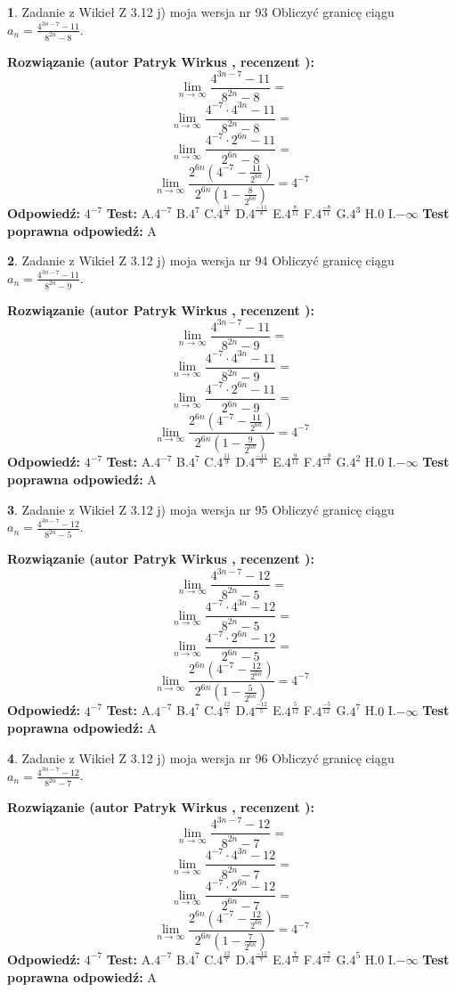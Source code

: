 \documentclass[12pt, a4paper]{article}
\theoremstyle{definition} %
\newtheorem{zad}{}
\newcommand{\zadStart}[1]{\begin{zad}#1\newline}
\newcommand{\zadStop}{\end{zad}}
\newcommand{\rozwStart}[2]{\noindent \textbf{Rozwiązanie (autor #1 , recenzent #2): }\newline}
\newcommand{\rozwStop}{\newline}
\newcommand{\odpStart}{\noindent \textbf{Odpowiedź:}\newline}
\newcommand{\odpStop}{\newline}
\newcommand{\testStart}{\noindent \textbf{Test:}\newline}
\newcommand{\testStop}{\newline}
\newcommand{\kluczStart}{\noindent \textbf{Test poprawna odpowiedź:}\newline}
\newcommand{\kluczStop}{\newline}
\begin{document}
\zadStart{Zadanie z Wikieł Z 3.12 j) moja wersja nr 93}
Obliczyć granicę ciągu $a_{n}=\frac{4^{3n-7}-11}{8^{2n}-8}$.
\zadStop
\rozwStart{Patryk Wirkus}{}
$$\lim\limits_{n\to\infty}\frac{4^{3n-7}-11}{8^{2n}-8}=$$
$$\lim\limits_{n\to\infty}\frac{4^{-7} \cdot 4^{3n}-11}{8^{2n}-8}=$$
$$\lim\limits_{n\to\infty}\frac{4^{-7} \cdot 2^{6n}-11}{2^{6n}-8}=$$
$$\lim\limits_{n\to\infty}\frac{2^{6n}(4^{-7} - \frac{11}{2^{6n}})}{2^{6n}(1-\frac{8}{2^{6n}})}= 4^{-7}$$
\rozwStop
\odpStart
$4^{-7}$
\odpStop
\testStart
A.$4^{-7}$
B.$4^{7}$
C.$4^{\frac{11}{8}}$
D.$4^{\frac{-11}{8}}$
E.$4^{\frac{8}{11}}$
F.$4^{\frac{-8}{11}}$
G.$4^{3}$
H.$0$
I.$-\infty$
\testStop
\kluczStart
A
\kluczStop



\zadStart{Zadanie z Wikieł Z 3.12 j) moja wersja nr 94}
Obliczyć granicę ciągu $a_{n}=\frac{4^{3n-7}-11}{8^{2n}-9}$.
\zadStop
\rozwStart{Patryk Wirkus}{}
$$\lim\limits_{n\to\infty}\frac{4^{3n-7}-11}{8^{2n}-9}=$$
$$\lim\limits_{n\to\infty}\frac{4^{-7} \cdot 4^{3n}-11}{8^{2n}-9}=$$
$$\lim\limits_{n\to\infty}\frac{4^{-7} \cdot 2^{6n}-11}{2^{6n}-9}=$$
$$\lim\limits_{n\to\infty}\frac{2^{6n}(4^{-7} - \frac{11}{2^{6n}})}{2^{6n}(1-\frac{9}{2^{6n}})}= 4^{-7}$$
\rozwStop
\odpStart
$4^{-7}$
\odpStop
\testStart
A.$4^{-7}$
B.$4^{7}$
C.$4^{\frac{11}{9}}$
D.$4^{\frac{-11}{9}}$
E.$4^{\frac{9}{11}}$
F.$4^{\frac{-9}{11}}$
G.$4^{2}$
H.$0$
I.$-\infty$
\testStop
\kluczStart
A
\kluczStop



\zadStart{Zadanie z Wikieł Z 3.12 j) moja wersja nr 95}
Obliczyć granicę ciągu $a_{n}=\frac{4^{3n-7}-12}{8^{2n}-5}$.
\zadStop
\rozwStart{Patryk Wirkus}{}
$$\lim\limits_{n\to\infty}\frac{4^{3n-7}-12}{8^{2n}-5}=$$
$$\lim\limits_{n\to\infty}\frac{4^{-7} \cdot 4^{3n}-12}{8^{2n}-5}=$$
$$\lim\limits_{n\to\infty}\frac{4^{-7} \cdot 2^{6n}-12}{2^{6n}-5}=$$
$$\lim\limits_{n\to\infty}\frac{2^{6n}(4^{-7} - \frac{12}{2^{6n}})}{2^{6n}(1-\frac{5}{2^{6n}})}= 4^{-7}$$
\rozwStop
\odpStart
$4^{-7}$
\odpStop
\testStart
A.$4^{-7}$
B.$4^{7}$
C.$4^{\frac{12}{5}}$
D.$4^{\frac{-12}{5}}$
E.$4^{\frac{5}{12}}$
F.$4^{\frac{-5}{12}}$
G.$4^{7}$
H.$0$
I.$-\infty$
\testStop
\kluczStart
A
\kluczStop



\zadStart{Zadanie z Wikieł Z 3.12 j) moja wersja nr 96}
Obliczyć granicę ciągu $a_{n}=\frac{4^{3n-7}-12}{8^{2n}-7}$.
\zadStop
\rozwStart{Patryk Wirkus}{}
$$\lim\limits_{n\to\infty}\frac{4^{3n-7}-12}{8^{2n}-7}=$$
$$\lim\limits_{n\to\infty}\frac{4^{-7} \cdot 4^{3n}-12}{8^{2n}-7}=$$
$$\lim\limits_{n\to\infty}\frac{4^{-7} \cdot 2^{6n}-12}{2^{6n}-7}=$$
$$\lim\limits_{n\to\infty}\frac{2^{6n}(4^{-7} - \frac{12}{2^{6n}})}{2^{6n}(1-\frac{7}{2^{6n}})}= 4^{-7}$$
\rozwStop
\odpStart
$4^{-7}$
\odpStop
\testStart
A.$4^{-7}$
B.$4^{7}$
C.$4^{\frac{12}{7}}$
D.$4^{\frac{-12}{7}}$
E.$4^{\frac{7}{12}}$
F.$4^{\frac{-7}{12}}$
G.$4^{5}$
H.$0$
I.$-\infty$
\testStop
\kluczStart
A
\kluczStop
\end{document}
